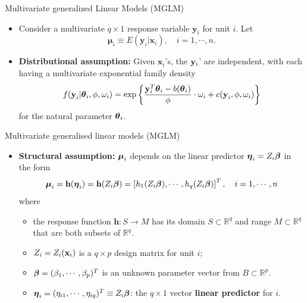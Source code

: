 \documentclass{beamer}
\newcommand{\boldmu}{{\boldsymbol \mu}}
\newenvironment{wideitemize}%
  {\begin{itemize}%
    \setlength{\parskip}{1em}}%
  {\end{itemize}}
\begin{document}

\begin{frame}{Multivariate generalized Linear Models (MGLM)}
\begin{wideitemize}

\item
Consider a multivariate $q\times 1$ response variable $\textbf{y}_i$ for unit $i$. Let
\[
\boldmu_i \equiv E(\textbf{y}_i | \textbf{x}_i), \quad i=1,\cdots, n.
\]
\item
\textbf{Distributional assumption:} Given $\textbf{x}_i$'s, the ${\bf y}_i$' are independent, with each having a multivariate exponential family density
$$f(\textbf{y}_i | \mbox{\boldmath $\theta$}_i, \phi, \omega_i)=\exp\left\{\frac{\textbf{y}_i^T
 \mbox{\boldmath $\theta$}_i-b(\mbox{\boldmath $\theta$}_i)}{\phi}\cdot \omega_i + 
c(\textbf{y}_i,\phi, \omega_i)\right\}$$
for the natural parameter $\mbox{\boldmath $\theta$}_i$.
\end{wideitemize}
\end{frame}

\begin{frame} {Multivariate generalised linear models (MGLM)}
\begin{itemize}
\item
\textbf{Structural assumption:} $\mbox{\boldmath $\mu$}_i$ depends on the linear predictor
$\mbox{\boldmath $\eta$}_i=Z_i\mbox{\boldmath $\beta$}$ in the form
$$\mbox{\boldmath $\mu$}_i=\textbf{h}(\mbox{\boldmath $\eta$}_i)=
\textbf{h}(Z_i\mbox{\boldmath $\beta$})=\left[h_1(Z_i\mbox{\boldmath $\beta$}),
\cdots,h_q(Z_i\mbox{\boldmath $\beta$})\right]^T, \quad i=1,\cdots,n$$
where
\begin{wideitemize}
\item
the response function $\textbf{h}: S\rightarrow M$ 
has its domain $S \subset \mathbb{R}^q $ and range $M \subset \mathbb{R}^q$ that are both subsets of $\mathbb{R}^q$.


\item
$Z_i = Z_i({\bf x}_i)$ is a $q\times p$ design matrix for unit $i$;
\item
$\mbox{\boldmath $\beta$}=(\beta_1,\cdots,\beta_p)^T$ is an unknown parameter vector
from $B\subset\mathbb{R}^p$.

\item $\mbox{\boldmath $\eta$}_i= (\eta_{i1},\cdots,\eta_{iq})^T \equiv Z_i\mbox{\boldmath $\beta$}$: the $q\times 1$ vector  {\bf linear predictor}  for  $i$.
\end{wideitemize}
\end{itemize}

\end{frame}
\end{document}
